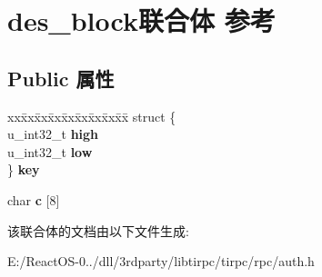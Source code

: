 \hypertarget{uniondes__block}{}\section{des\+\_\+block联合体 参考}
\label{uniondes__block}
\subsection*{Public 属性}
\begin{DoxyCompactItemize}
\item 
\mbox{\label{uniondes__block_a8f5b9eaeafffad72332b51da56830087}} 
\begin{tabbing}
xx\=xx\=xx\=xx\=xx\=xx\=xx\=xx\=xx\=\kill
struct \{\\
\>u\_int32\_t {\bfseries high}\\
\>u\_int32\_t {\bfseries low}\\
\} {\bfseries key}\\

\end{tabbing}\item 
\mbox{\label{uniondes__block_a8bda6863f4090f32ff57cd3b735b3db8}} 
char {\bfseries c} \mbox{[}8\mbox{]}
\end{DoxyCompactItemize}


该联合体的文档由以下文件生成\+:\begin{DoxyCompactItemize}
\item 
E\+:/\+React\+O\+S-\/0../dll/3rdparty/libtirpc/tirpc/rpc/auth.\+h\end{DoxyCompactItemize}
